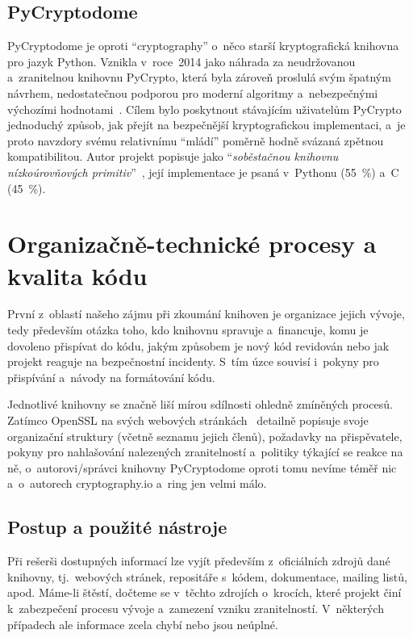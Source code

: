 \subsection*{PyCryptodome}

PyCryptodome je oproti ``cryptography'' o~něco starší kryptografická knihovna pro jazyk Python. Vznikla v~roce~2014 jako náhrada za neudržovanou a~zranitelnou knihovnu PyCrypto, která byla zároveň proslulá svým špatným návrhem, nedostatečnou podporou pro moderní algoritmy a~nebezpečnými výchozími hodnotami~\cite{comparing2017}. Cílem bylo poskytnout stávajícím uživatelům PyCrypto jednoduchý způsob, jak přejít na bezpečnější kryptografickou implementaci, a~je proto navzdory svému relativnímu ``mládí'' poměrně hodně svázaná zpětnou kompatibilitou. Autor projekt popisuje jako ``\textit{soběstačnou knihovnu nízkoúrovňových primitiv}''~\cite{pycryptodome}, její implementace je psaná v~Pythonu (55~\%) a~C (45~\%).

\section{Organizačně-technické procesy a kvalita kódu}

První z~oblastí našeho zájmu při zkoumání knihoven je organizace jejich vývoje, tedy především otázka toho, kdo knihovnu spravuje a~financuje, komu je dovoleno přispívat do kódu, jakým způsobem je nový kód revidován nebo jak projekt reaguje na bezpečnostní incidenty. S~tím úzce souvisí i~pokyny pro přispívání a~návody na formátování kódu.

Jednotlivé knihovny se značně liší mírou sdílnosti ohledně zmíněných procesů. Zatímco Open\-SSL na svých webových stránkách~\cite{openssl-web} detailně popisuje svoje organizační struktury (včetně seznamu jejich členů), požadavky na přispěvatele, pokyny pro nahlašování nalezených zranitelností a~politiky týkající se reakce na ně, o~autorovi/správci knihovny PyCryptodome oproti tomu nevíme téměř nic a~o~autorech cryptography.io a~ring jen velmi málo.

\subsection{Postup a použité nástroje}

Při rešerši dostupných informací lze vyjít především z~oficiálních zdrojů dané knihovny, tj.~we\-bo\-vých stránek, repositáře s~kódem, dokumentace, mailing listů, apod. Máme-li štěstí, dočteme se v~těchto zdrojích o~krocích, které projekt činí k~zabezpečení procesu vývoje a~zamezení vzniku zranitelností. V~některých případech ale informace zcela chybí nebo jsou neúplné.

